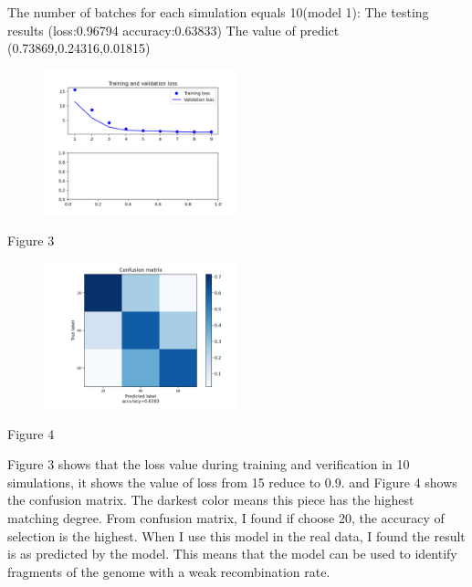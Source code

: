 \documentclass[11pt,a4 paper,title page]{article}
\begin{document}
The number of batches for each simulation equals 10(model 1):
\hfill\break 
The testing results (loss:0.96794 accuracy:0.63833)
\hfill\break 
The value of predict (0.73869,0.24316,0.01815)
\begin{figure}[H]
\centering
\includegraphics[width=0.5\textwidth,angle=360]{../picture/figure3.png}
\end{figure}
\centerline{Figure 3}
\hfill\break 
\begin{figure}[H]
\centering
\includegraphics[width=0.5\textwidth,angle=360]{../picture/figure4.png}
\end{figure}
\centerline{Figure 4}
\hfill\break 
Figure 3 shows that the loss value during training and verification in 10 simulations, it shows the value of loss from 15 reduce to 0.9. and Figure 4 shows the confusion matrix. The darkest color means this piece has the highest matching degree. From confusion matrix, I found if choose 20, the accuracy of selection is the highest. When I use this model in the real data, I found the result is as predicted by the model. This means that the model can be used to identify fragments of the genome with a weak recombination rate.
\hfill\break 
\end{document}
